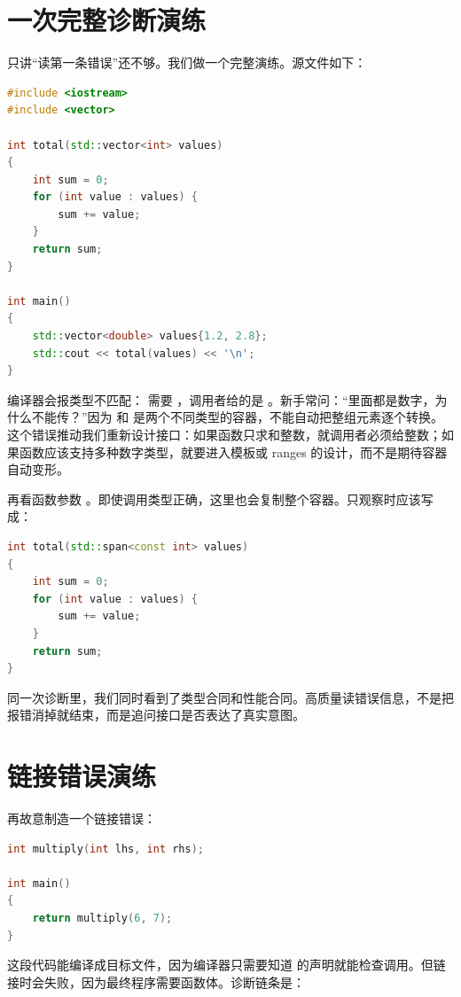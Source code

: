 \section{一次完整诊断演练}

只讲“读第一条错误”还不够。我们做一个完整演练。源文件如下：

\begin{lstlisting}[language=C++,caption={含有多类错误的实验程序}]
#include <iostream>
#include <vector>

int total(std::vector<int> values)
{
    int sum = 0;
    for (int value : values) {
        sum += value;
    }
    return sum;
}

int main()
{
    std::vector<double> values{1.2, 2.8};
    std::cout << total(values) << '\n';
}
\end{lstlisting}

编译器会报类型不匹配： 需要 ，调用者给的是 。新手常问：“里面都是数字，为什么不能传？”因为  和  是两个不同类型的容器，不能自动把整组元素逐个转换。这个错误推动我们重新设计接口：如果函数只求和整数，就调用者必须给整数；如果函数应该支持多种数字类型，就要进入模板或 ranges 的设计，而不是期待容器自动变形。

再看函数参数 。即使调用类型正确，这里也会复制整个容器。只观察时应该写成：

\begin{lstlisting}[language=C++,caption={诊断后修正接口}]
int total(std::span<const int> values)
{
    int sum = 0;
    for (int value : values) {
        sum += value;
    }
    return sum;
}
\end{lstlisting}

同一次诊断里，我们同时看到了类型合同和性能合同。高质量读错误信息，不是把报错消掉就结束，而是追问接口是否表达了真实意图。

\section{链接错误演练}

再故意制造一个链接错误：

\begin{lstlisting}[language=C++,caption={只有声明没有定义}]
int multiply(int lhs, int rhs);

int main()
{
    return multiply(6, 7);
}
\end{lstlisting}

这段代码能编译成目标文件，因为编译器只需要知道  的声明就能检查调用。但链接时会失败，因为最终程序需要函数体。诊断链条是：

